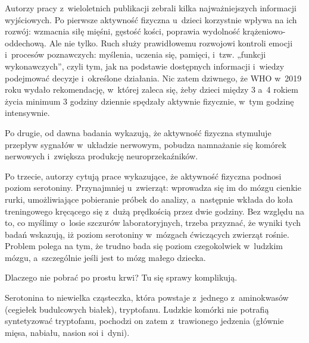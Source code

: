 Autorzy pracy z~wieloletnich publikacji zebrali kilka najważniejszych informacji wyjściowych. Po pierwsze aktywność fizyczna u~dzieci korzystnie wpływa na ich rozwój: wzmacnia siłę mięśni, gęstość kości, poprawia wydolność krążeniowo-oddechową. Ale nie tylko.  Ruch służy  prawidłowemu rozwojowi kontroli emocji i~procesów poznawczych: myślenia, uczenia się, pamięci, i~tzw. „funkcji wykonawczych”, czyli tym, jak na podstawie dostępnych informacji i~wiedzy podejmować decyzje i~określone działania. Nic zatem dziwnego, że WHO w~2019 roku wydało rekomendację, w~której zaleca się, żeby dzieci między 3 a~4 rokiem życia minimum 3 godziny dziennie spędzały aktywnie fizycznie, w~tym godzinę intensywnie.
\eject
\begin{dwieszpalty}
Po drugie, od dawna badania wykazują, że aktywność fizyczna stymuluje przepływ sygnałów w~układzie nerwowym,  pobudza namnażanie się komórek nerwowych i~zwiększa produkcję neuroprzekaźników.

Po trzecie,  autorzy cytują prace wykazujące, że aktywność fizyczna podnosi poziom serotoniny. Przynajmniej u~zwierząt: wprowadza się im do mózgu cienkie rurki, umożliwiające pobieranie próbek do analizy, a~następnie wkłada do koła treningowego kręcącego się z~dużą prędkością przez dwie godziny. Bez względu na to, co myślimy o~losie szczurów laboratoryjnych, trzeba przyznać, że wyniki tych badań wskazują, iż poziom serotoniny w~mózgach ćwiczących zwierząt rośnie. Problem  polega na tym, że trudno bada się poziom czegokolwiek w~ludzkim mózgu, a~szczególnie jeśli jest to mózg małego dziecka.

Dlaczego nie pobrać po prostu krwi? Tu się sprawy komplikują.

Serotonina to niewielka cząsteczka, która powstaje z~jednego z~aminokwasów (cegiełek budulcowych białek),  tryptofanu. Ludzkie komórki nie potrafią syntetyzować tryptofanu, pochodzi on zatem z~trawionego jedzenia (głównie mięsa, nabiału, nasion soi i~dyni).


\end{dwieszpalty}
